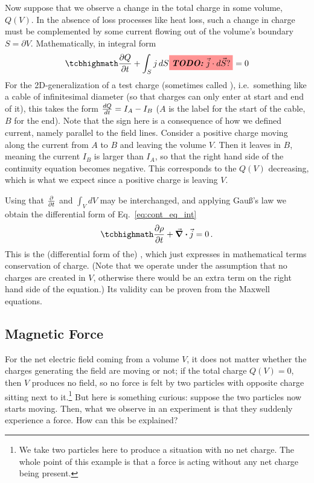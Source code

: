 \documentclass[../class_mech_main.tex]{subfiles}
\begin{document}
Now suppose that we observe a change in the total charge in some volume, $Q(V)$. In the absence of loss processes like heat loss, such a change in charge must be complemented by some current flowing out of the volume's boundary $S = \partial V$. Mathematically, in integral form
\begin{equation}\label{eq:cont_eq_int}
    \eqbox{
        \pdv{Q}{t} + \int_S j \, dS \todo{$\vec{j} \cdot d\vec{S}$?} = 0
    }
\end{equation}
For the 2D-generalization of a test charge (sometimes called ), i.e.~something like a cable of infinitesimal diameter (so that charges can only enter at start and end of it), this takes the form $\dv{Q}{t} = I_A - I_B$ ($A$ is the label for the start of the cable, $B$ for the end). Note that the sign here is a consequence of how we defined current, namely parallel to the field lines. Consider a positive charge moving along the current from $A$ to $B$ and leaving the volume $V$. Then it leaves in $B$, meaning the current $I_B$ is larger than $I_A$, so that the right hand side of the continuity equation becomes negative. This corresponds to the $Q(V)$ decreasing, which is what we expect since a positive charge is leaving $V$.


Using that $\pdv{t}$ and $\int_V dV$ may be interchanged, and applying Gauß's law we obtain the differential form of Eq.~\eqref{eq:cont_eq_int}
\begin{equation}\label{eq:cont_eq_diff}
    \eqbox{
        \pdv{\rho}{t} + \div \vec{j} = 0
    } \, .
\end{equation}
This is the (differential form of the) , which just expresses in mathematical terms conservation of charge. (Note that we operate under the assumption that no charges are created in $V$, otherwise there would be an extra term on the right hand side of the equation.) Its validity can be proven from the Maxwell equations.





        \subsection{Magnetic Force}
For the net electric field coming from a volume $V$, it does not matter whether the charges generating the field are moving or not; if the total charge $Q(V) = 0$, then $V$ produces no field, so no force is felt by two particles with opposite charge sitting next to it.\footnote{We take two particles here to produce a situation with no net charge. The whole point of this example is that a force is acting without any net charge being present.} But here is something curious: suppose the two particles now starts moving. Then, what we observe in an experiment is that they suddenly experience a force. How can this be explained?
\end{document}
